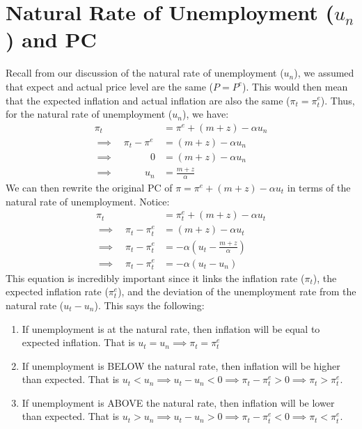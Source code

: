 \documentclass{extarticle}
\begin{document}
\section{Natural Rate of Unemployment ($u_n$) and PC}
Recall from our discussion of the natural rate of unemployment ($u_n$), we assumed that expect and actual price level are the same ($P = P^e$). This would then mean that the expected inflation and actual inflation are also the same ($\pi_t = \pi^e_t$). Thus, for the natural rate of unemployment ($u_n$), we have:
\begin{align*}
    \pi_t               &= \pi^e + (m+z) - \alpha u_n \\
    \implies \quad \pi_t - \pi^{e} &= (m+z) - \alpha u_n \\
    \implies \quad \quad \quad \; \; \, 0        &= (m+z) - \alpha u_n \\
    \implies \quad \quad \quad \, u_n &= \frac{m+z}{\alpha}
\end{align*}
We can then rewrite the original PC of $\pi = \pi^e + (m+z) - \alpha u_t$ in terms of the natural rate of unemployment. Notice:
\begin{align*}
    \pi_t               &= \pi^e_t + (m+z) - \alpha u_t \\
    \implies \quad \pi_t - \pi^e_t &= (m+z) - \alpha u_t \\
    \implies \quad \pi_t - \pi^e_t &= -\alpha(u_t - \frac{m+z}{\alpha}) \\
    \implies \quad \pi_t - \pi^e_t &= -\alpha(u_t - u_n)
\end{align*}
This equation is incredibly important since it links the inflation rate ($\pi_t$), the expected inflation rate ($\pi^e_t$), and the deviation of the unemployment rate from the natural rate ($u_t - u_n$). This says the following:
\begin{enumerate}
    \item If unemployment is at the natural rate, then inflation will be equal to expected inflation. That is $u_t = u_n \implies \pi_t = \pi_t^e$
    \item If unemployment is BELOW the natural rate, then inflation will be higher than expected. That is $u_t < u_n \implies u_t - u_n < 0 \implies \pi_t - \pi_t^e > 0 \implies \pi_t > \pi_t^e$.
    \item If unemployment is ABOVE the natural rate, then inflation will be lower than expected. That is $u_t > u_n \implies u_t - u_n > 0 \implies \pi_t - \pi_t^e < 0 \implies \pi_t < \pi_t^e$.
\end{enumerate}
\end{document}
